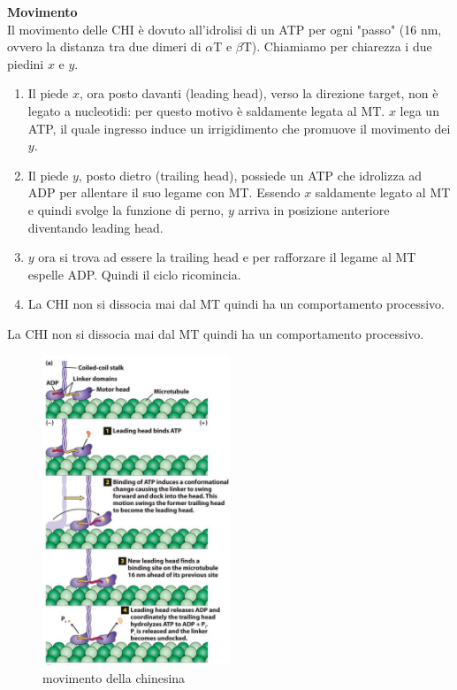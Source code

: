             \textbf{Movimento}\\
                Il movimento delle CHI è dovuto all'idrolisi di un ATP per ogni "passo" (16 nm, ovvero la distanza tra due dimeri di $\alpha$T e $\beta$T).
                Chiamiamo per chiarezza i due piedini $x$ e $y$. 
                \begin{enumerate}
                    \item Il piede $x$, ora posto davanti (leading head), verso la direzione target, non è legato a nucleotidi: per questo motivo è saldamente legata al MT. $x$ lega un ATP, il quale ingresso induce un irrigidimento che promuove il movimento dei $y$.
                    \item Il piede $y$, posto dietro (trailing head), possiede un ATP che idrolizza ad ADP per allentare il suo legame con MT. Essendo $x$ saldamente legato al MT e quindi svolge la funzione di perno, $y$ arriva in posizione anteriore diventando leading head.
                    \item  $y$ ora si trova ad essere la trailing head e per rafforzare il legame al MT espelle ADP. Quindi il ciclo ricomincia.
                    \item La CHI non si dissocia mai dal MT quindi ha un comportamento processivo.
                \end{enumerate}
                La CHI non si dissocia mai dal MT quindi ha un comportamento processivo.
                \begin{figure}[h]
                    \centering
                    \includegraphics[width=0.5\textwidth]{images/chinesinMovement.JPG}
                    \caption{\small movimento della chinesina}
                    \label{fig:mesh1}
                \end{figure}\\
                
